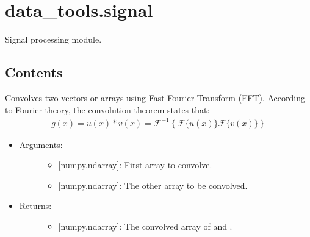 \documentclass[letterpaper,10pt,english]{sphinxmanual}
\begin{document}
\label{\detokenize{signal:module-data_tools.signal}}

\section{data\_tools.signal}
\label{\detokenize{signal:data-tools-signal}}\label{\detokenize{signal::doc}}
Signal processing module.


\subsection{Contents}
\label{\detokenize{signal:contents}}

\begin{fulllineitems}
\label{\detokenize{signal:data_tools.signal.fconvolve}}
Convolves two vectors or arrays using Fast Fourier Transform (FFT).
According to Fourier theory, the convolution theorem states that:
\begin{equation*}
\begin{split}g(x)=u(x)\ast v(x)=\mathcal{F}^{-1}\left\{\mathcal{F}\{u(x)
\}\mathcal{F}\{v(x)\}\right\}\end{split}
\end{equation*}\begin{itemize}
\item {} \begin{description}
\item[{Arguments:}] \leavevmode\begin{itemize}
\item {} 
 {[}numpy.ndarray{]}: First array to convolve.

\item {} 
 {[}numpy.ndarray{]}: The other array to be convolved.

\end{itemize}

\end{description}

\item {} \begin{description}
\item[{Returns:}] \leavevmode\begin{itemize}
\item {} 
{[}numpy.ndarray{]}: The convolved array of  and .

\end{itemize}

\end{description}

\end{itemize}

\end{fulllineitems}
\end{document}
